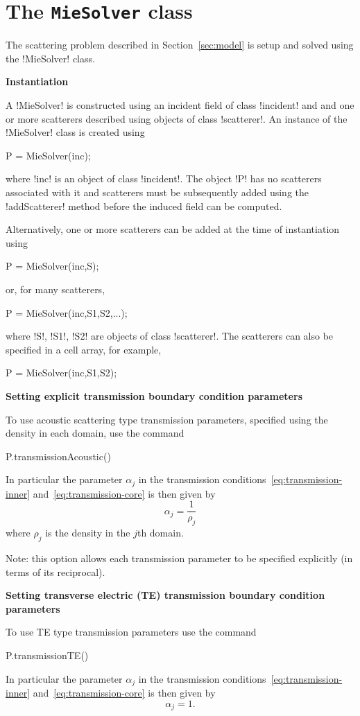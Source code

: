 \documentclass[11pt,letterpaper]{article}
\newcommand{\techheading}[1]{%
    \par\vspace{-0.3\parskip}\noindent\hspace{-1cm}\textbf{#1}%
    \par\vspace{-0.5\parskip}\noindent\nopagebreak\ignorespaces}
\begin{document}
\section{The \texttt{MieSolver} class}
\label{sec:mieproblem}

The scattering problem described in Section~\ref{sec:model} is setup
and solved using the !MieSolver! class.

\techheading{Instantiation}
A !MieSolver! is constructed using an incident field
of class !incident! and
and one or more scatterers described using objects of class !scatterer!.
An instance of the !MieSolver! class is created using
\begin{matlab}
  P = MieSolver(inc);
\end{matlab}
where !inc! is an object of class !incident!.
The object !P! has no scatterers associated with it and scatterers
must be subsequently added
using the !addScatterer! method
before the induced field can be computed.

Alternatively, one or more scatterers can be added at the time of
instantiation using
\begin{matlab}
P = MieSolver(inc,S);
\end{matlab}
or, for many scatterers,
\begin{matlab}
P = MieSolver(inc,S1,S2,...);
\end{matlab}
where !S!, !S1!, !S2! are objects of class !scatterer!.
The scatterers can also be specified in a cell array,
for example,
\begin{matlab}
P = MieSolver(inc,{S1,S2});
\end{matlab}

\techheading{Setting explicit transmission boundary condition parameters}
To use acoustic scattering type
transmission parameters, specified using the density in each
domain, use the command
\begin{matlab}
P.transmissionAcoustic()
\end{matlab}
In particular the parameter $\alpha_j$
in the transmission
conditions~\eqref{eq:transmission-inner}
and~\eqref{eq:transmission-core} is then given by
\begin{displaymath}
\alpha_j = \frac{1}{\rho_j}
\end{displaymath}
where $\rho_j$ is the density in the $j$th domain.

Note: this option allows each transmission parameter to be specified
explicitly (in terms of its reciprocal).

\techheading{Setting transverse electric (TE)
transmission boundary condition parameters}
To use TE type transmission parameters use the command
\begin{matlab}
P.transmissionTE()
\end{matlab}
In particular the parameter $\alpha_j$
in the transmission
conditions~\eqref{eq:transmission-inner}
and~\eqref{eq:transmission-core} is then given by
\begin{displaymath}
\alpha_j = 1.
\end{displaymath}
\end{document}
